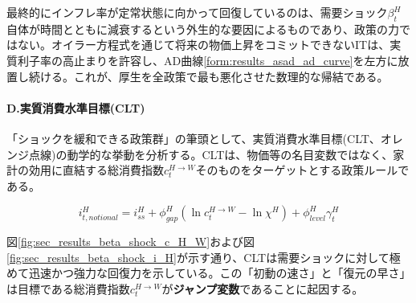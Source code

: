 最終的にインフレ率が定常状態に向かって回復しているのは、需要ショック\(\beta_t^H\)自体が時間とともに減衰するという外生的な要因によるものであり、政策の力ではない。オイラー方程式を通じて将来の物価上昇をコミットできないITは、実質利子率の高止まりを許容し、AD曲線\eqref{form:results_asad_ad_curve}を左方に放置し続ける。これが、厚生を全政策で最も悪化させた数理的な帰結である。

\paragraph{D.実質消費水準目標(CLT)}\label{sec:sec_results_beta_shock_analysis_clt}
「ショックを緩和できる政策群」の筆頭として、実質消費水準目標(CLT、オレンジ点線)の動学的な挙動を分析する。CLTは、物価等の名目変数ではなく、家計の効用に直結する総消費指数\(c_t^{H\to W}\)そのものをターゲットとする政策ルールである。

\begin{equation}
i_{t,notional}^H=i_{ss}^H+\phi_{gap}^H(\ln c_t^{H\to W}-\ln\chi^H)+\phi_{level}^H\gamma_t^H
\label{form:sec_results_beta_shock_analysis_clt_policy}
\end{equation}

図\ref{fig:sec_results_beta_shock_c_H_W}および図\ref{fig:sec_results_beta_shock_i_H}が示す通り、CLTは需要ショックに対して極めて迅速かつ強力な回復力を示している。この「初動の速さ」と「復元の早さ」は目標である総消費指数\(c_t^{H\to W}\)が\textbf{ジャンプ変数}であることに起因する。

